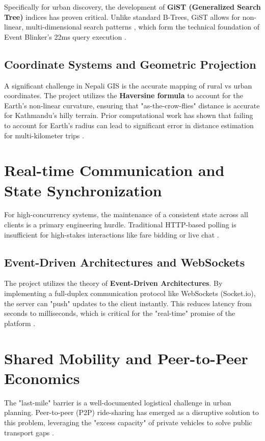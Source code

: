 Specifically for urban discovery, the development of \textbf{GiST (Generalized Search Tree)} indices has proven critical. Unlike standard B-Trees, GiST allows for non-linear, multi-dimensional search patterns \cite{knuth}, which form the technical foundation of Event Blinker's 22ms query execution \cite{gist}.

\subsection{Coordinate Systems and Geometric Projection}
A significant challenge in Nepali GIS is the accurate mapping of rural vs urban coordinates. The project utilizes the \textbf{Haversine formula} to account for the Earth's non-linear curvature, ensuring that "as-the-crow-flies" distance is accurate for Kathmandu's hilly terrain. Prior computational work has shown that failing to account for Earth's radius can lead to significant error in distance estimation for multi-kilometer trips \cite{urbanGIS}.

\section{Real-time Communication and State Synchronization}
For high-concurrency systems, the maintenance of a consistent state across all clients is a primary engineering hurdle. Traditional HTTP-based polling is insufficient for high-stakes interactions like fare bidding or live chat \cite{socketio}.

\subsection{Event-Driven Architectures and WebSockets}
The project utilizes the theory of \textbf{Event-Driven Architectures}. By implementing a full-duplex communication protocol like WebSockets (Socket.io), the server can "push" updates to the client instantly. This reduces latency from seconds to milliseconds, which is critical for the "real-time" promise of the platform \cite{socketio}.

\section{Shared Mobility and Peer-to-Peer Economics}
The "last-mile" barrier is a well-documented logistical challenge in urban planning. Peer-to-peer (P2P) ride-sharing has emerged as a disruptive solution to this problem, leveraging the "excess capacity" of private vehicles to solve public transport gaps \cite{peer2peer}.

